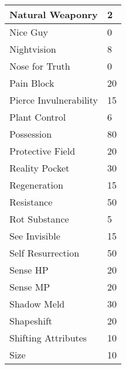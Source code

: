 \documentclass[twoside]{book}
\begin{document}
\begin{longtable}{p{1.25in}l}
  \raggedright
           Natural Weaponry 
  &
   2 
  \tabularnewline
  \hline
      
  \raggedright
           Nice Guy 
  &
   0 
  \tabularnewline
  \hline
      
  \raggedright
           Nightvision 
  &
   8 
  \tabularnewline
  \hline
      
  \raggedright
           Nose for Truth 
  &
   0 
  \tabularnewline
  \hline
      
  \raggedright
           Pain Block 
  &
   20 
  \tabularnewline
  \hline
      
  \raggedright
           Pierce Invulnerability 
  &
   15 
  \tabularnewline
  \hline
      
  \raggedright
           Plant Control 
  &
   6 
  \tabularnewline
  \hline
      
  \raggedright
           Possession 
  &
   80 
  \tabularnewline
  \hline
      
  \raggedright
           Protective Field 
  &
   20 
  \tabularnewline
  \hline
      
  \raggedright
           Reality Pocket 
  &
   30 
  \tabularnewline
  \hline
      
  \raggedright
           Regeneration 
  &
   15 
  \tabularnewline
  \hline
      
  \raggedright
           Resistance 
  &
   50 
  \tabularnewline
  \hline
      
  \raggedright
           Rot Substance 
  &
   5 
  \tabularnewline
  \hline
      
  \raggedright
           See Invisible 
  &
   15 
  \tabularnewline
  \hline
      
  \raggedright
           Self Resurrection 
  &
   50 
  \tabularnewline
  \hline
      
  \raggedright
           Sense HP 
  &
   20 
  \tabularnewline
  \hline
      
  \raggedright
           Sense MP 
  &
   20 
  \tabularnewline
  \hline
      
  \raggedright
           Shadow Meld 
  &
   30 
  \tabularnewline
  \hline
      
  \raggedright
           Shapeshift 
  &
   20 
  \tabularnewline
  \hline
      
  \raggedright
           Shifting Attributes 
  &
   10 
  \tabularnewline
  \hline
      
  \raggedright
           Size 
  &
   10 
  \tabularnewline
  \hline
      

\end{longtable}
\end{document}
